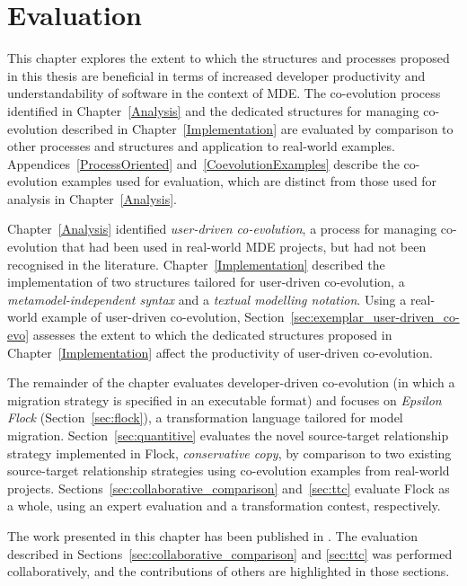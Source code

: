 
\chapter{Evaluation}
\label{Evaluation}
This chapter explores the extent to which the structures and processes proposed in this thesis are beneficial in terms of increased developer productivity and understandability of software in the context of MDE. The co-evolution process identified in Chapter~\ref{Analysis} and the dedicated structures for managing co-evolution described in Chapter~\ref{Implementation} are evaluated by comparison to other processes and structures and application to real-world examples. Appendices~\ref{ProcessOriented} and~\ref{CoevolutionExamples} describe the co-evolution examples used for evaluation, which are distinct from those used for analysis in Chapter~\ref{Analysis}.

Chapter~\ref{Analysis} identified \emph{user-driven co-evolution}, a process for managing co-evolution that had been used in real-world MDE projects, but had not been recognised in the literature. Chapter~\ref{Implementation} described the implementation of two structures tailored for user-driven co-evolution, a \emph{metamodel-independent syntax} and a \emph{textual modelling notation}. Using a real-world example of user-driven co-evolution, Section~\ref{sec:exemplar_user-driven_co-evo} assesses the extent to which the dedicated structures proposed in Chapter~\ref{Implementation} affect the productivity of user-driven co-evolution.

The remainder of the chapter evaluates developer-driven co-evolution (in which a migration strategy is specified in an executable format) and focuses on \emph{Epsilon Flock} (Section~\ref{sec:flock}), a transformation language tailored for model migration. Section~\ref{sec:quantitive} evaluates the novel source-target relationship strategy implemented in Flock, \emph{conservative copy}, by comparison to two existing source-target relationship strategies using co-evolution examples from real-world projects. Sections~\ref{sec:collaborative_comparison} and~\ref{sec:ttc} evaluate Flock as a whole, using an expert evaluation and a transformation contest, respectively.

The work presented in this chapter has been published in \cite{rose10comparison,rose10ttc_solution,rose10ttc_case}. The evaluation described in Sections~\ref{sec:collaborative_comparison} and \ref{sec:ttc} was performed collaboratively, and the contributions of others are highlighted in those sections.

